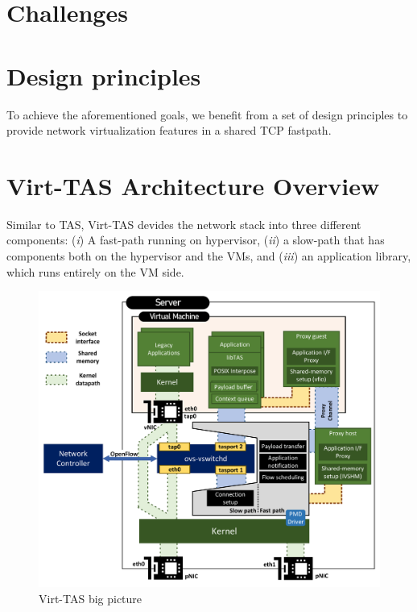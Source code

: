 \section{Challenges}

\section{Design principles}
To achieve the aforementioned goals, we benefit from a set of design principles 
to provide network virtualization features in a shared TCP fastpath.

\section{Virt-TAS Architecture Overview}

Similar to TAS, Virt-TAS devides the network stack into three different components:
(\emph{i}) A fast-path running on hypervisor, (\emph{ii}) a slow-path that has components
both on the hypervisor and the VMs, and (\emph{iii}) an application library, which 
runs entirely on the VM side. 



\begin{figure}
    \centering
    \includegraphics[scale=0.324]{../Figures/design.bigpicture.pdf}
    \caption{Virt-TAS big picture}
    \label{fig:overhead.throughput}
\end{figure}


